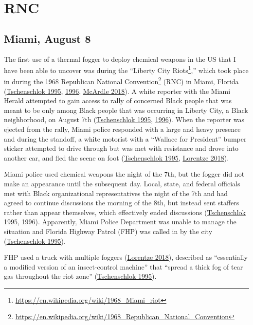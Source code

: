 \documentclass[
  11pt,
]{krantz}
\renewcommand{\href}[2]{#2\footnote{\url{#1}}}
\begin{document}
\hypertarget{rnc}{%
\section{RNC}\label{rnc}}

\hypertarget{MiamiFL1968_08_08}{%
\subsection{Miami, August 8}\label{MiamiFL1968_08_08}}

The first use of a thermal fogger to deploy chemical weapons in the US that I have been able to uncover was during the ``\href{https://en.wikipedia.org/wiki/1968_Miami_riot}{Liberty City Riots},'' which took place in during the \href{https://en.wikipedia.org/wiki/1968_Republican_National_Convention}{1968 Republican National Convention} (RNC) in Miami, Florida (\protect\hyperlink{ref-Tschenschlok1995}{Tschenschlok 1995}, \protect\hyperlink{ref-Tschenschlok1996}{1996}, \protect\hyperlink{ref-McArdle2018}{McArdle 2018}).
A white reporter with the Miami Herald attempted to gain access to rally of concerned Black people that was meant to be only among Black people that was occurring in Liberty City, a Black neighborhood, on August 7th (\protect\hyperlink{ref-Tschenschlok1995}{Tschenschlok 1995}, \protect\hyperlink{ref-Tschenschlok1996}{1996}).
When the reporter was ejected from the rally, Miami police responded with a large and heavy presence and during the standoff, a white motorist with a ``Wallace for President'' bumper sticker attempted to drive through but was met with resistance and drove into another car, and fled the scene on foot (\protect\hyperlink{ref-Tschenschlok1995}{Tschenschlok 1995}, \protect\hyperlink{ref-Lorentzen2018}{Lorentze 2018}).

Miami police used chemical weapons the night of the 7th, but the fogger did not make an appearance until the subsequent day.
Local, state, and federal officials met with Black organizational representatives the night of the 7th and had agreed to continue discussions the morning of the 8th, but instead sent staffers rather than appear themselves, which effectively ended discussions (\protect\hyperlink{ref-Tschenschlok1995}{Tschenschlok 1995}, \protect\hyperlink{ref-Tschenschlok1996}{1996}).
Apparently, Miami Police Department was unable to manage the situation and Florida Highway Patrol (FHP) was called in by the city (\protect\hyperlink{ref-Tschenschlok1995}{Tschenschlok 1995}).

FHP used a truck with multiple foggers (\protect\hyperlink{ref-Lorentzen2018}{Lorentze 2018}), described as ``essentially a modified version of an insect-control machine'' that ``spread a thick fog of tear gas throughout the riot zone'' (\protect\hyperlink{ref-Tschenschlok1995}{Tschenschlok 1995}).
\end{document}
